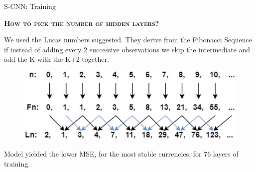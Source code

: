 \documentclass[aspectratio=169, 12pt]{beamer}
\begin{document}
\begin{frame}[allowframebreaks]{S-CNN: Training}
    \begin{center}
    \textsc{\textbf{How to pick the number of hidden layers?}}
    \end{center}
    We used the Lucas numbers suggested. They derive from the Fibonacci Sequence if instead of adding every 2 successive observations we skip the intermediate and add the K with the K+2 together.
    \begin{figure}[htbp]
    \centering
    \includegraphics[width=0.6\columnwidth]{./plots/fibonacci.jpg}
    \end{figure}

Model yielded the lower MSE, for the most stable currencies, for 76 layers of training.


\end{frame}
\end{document}
